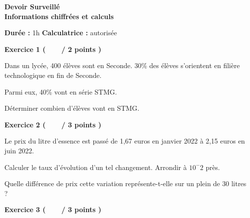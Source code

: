\documentclass[12pt,a4paper]{exam}
\begin{document}
\begin{center}
    \Large\textbf{Devoir Surveillé\\Informations chiffrées et calculs}
\end{center}

\vspace{0.3cm}

\noindent
\textbf{Durée :} 1h \hfill
\textbf{Calculatrice :} autorisée

\vspace{0.5cm}

\noindent
\textbf{Exercice 1 (\ \ \ \  / 2 points )}

\vspace{10pt}
Dans un lycée, 400 élèves sont en Seconde. 30\% des élèves s'orientent en filière 
technologique en fin de 
Seconde.

Parmi eux, 40\% vont en série STMG.

\begin{questions}

\question[2] Déterminer combien d'élèves vont en STMG.

\end{questions}

\vspace{1cm}

\noindent
\textbf{Exercice 2 (\ \ \ \  / 3 points )}

\vspace{10pt}
Le prix du litre d'essence est passé de 1,67 euros en janvier 2022 à 2,15 euros en juin 2022.

\begin{questions}

\question[1] Calculer le taux d'évolution d'un tel changement. Arrondir à $10^-2$ près.

\question[2] Quelle différence de prix cette variation représente-t-elle sur un plein de 30 litres ?

\end{questions}

\vspace{1cm}

\noindent
\textbf{Exercice 3 (\ \ \ \  / 3 points )}
\end{document}
